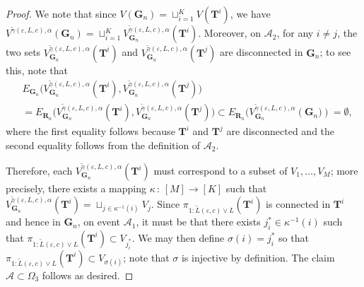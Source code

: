 \documentclass[twoside,11pt]{article}
\theoremstyle{remark}
\begin{document}
\begin{proof}
We note that since $V(\bm{G}_n) = \sqcup_{i=1}^K V(\bm{T}^i)$, we have $V^{{{\tilde{\gamma}(\varepsilon, L,c)}},\alpha}(\bm{G}_n) = \sqcup_{i=1}^K V_{\bm{G}_n}^{{{\tilde{\gamma}(\varepsilon, L,c)}}, \alpha}(\bm{T}^i)$. 
Moreover, on $\mathcal{A}_2$, for any $i \neq j$, the two sets $V^{{{\tilde{\gamma}(\varepsilon, L,c)}}, \alpha}_{\boldsymbol{G}_n}(\boldsymbol{T}^i)$ and $V^{{{\tilde{\gamma}(\varepsilon, L,c)}}, \alpha}_{\boldsymbol{G}_n}(\boldsymbol{T}^j)$ are disconnected in $\bm{G}_n$; to see this, note that
\begingroup
\[
\begin{aligned}
&E_{\boldsymbol{G}_n}\bigl(V^{{{\tilde{\gamma}(\varepsilon, L,c)}}, \alpha}_{\boldsymbol{G}_n}(\boldsymbol{T}^i),V^{{{\tilde{\gamma}(\varepsilon, L,c)}}, \alpha}_{\boldsymbol{G}_n}(\boldsymbol{T}^j)\bigr)\\
&=E_{\boldsymbol{R}_n}\bigl(V^{{{\tilde{\gamma}(\varepsilon, L,c)}}, \alpha}_{\boldsymbol{G}_n}(\boldsymbol{T}^i),V^{{{\tilde{\gamma}(\varepsilon, L,c)}}, \alpha}_{\boldsymbol{G}_n}(\boldsymbol{T}^j)\bigr)\subset E_{\boldsymbol{R}_n}\bigl(V^{{{\tilde{\gamma}(\varepsilon, L,c)}}, \alpha}_{\boldsymbol{G}_n}\left(\boldsymbol{G}_{n}\bigr)\right)=\emptyset,
\end{aligned}
\]
\endgroup
where the first equality follows because $\bm{T}^i$ and $\bm{T}^j$ are disconnected and the second equality follows from the definition of $\mathcal{A}_2$. 

Therefore, each $V^{{{\tilde{\gamma}(\varepsilon, L,c)}}, \alpha}_{\bm{G}_n}(\bm{T}^i)$ must correspond to a subset of $V_1, \ldots, V_M$; more precisely, there exists a mapping $\kappa \,:\, [M] \rightarrow [K]$ such that $V^{{{\tilde{\gamma}(\varepsilon, L,c)}}, \alpha}_{\bm{G}_n}(\bm{T}^i) = \sqcup_{j \in \kappa^{-1}(i)} V_j$. Since $\pi_{1:\tilde{L}(\varepsilon, c) \vee L }(\bm{T}^i)$ is connected in $\bm{T}^i$ and hence in $\bm{G}_n$, on event $\mathcal{A}_1$, it must be that there exists $j^*_i \in \kappa^{-1}(i)$ such that $\pi_{1:{\tilde{L}(\varepsilon, c)} \vee L }(\bm{T}^i) \subset V_{j^*_i}$. We may then define $\sigma(i) = j^*_i$ so that $\pi_{1:{\tilde{L}(\varepsilon, c)} \vee L }(\bm{T}^i) \subset V_{\sigma(i)}$; note that $\sigma$ is injective by definition. 
The claim $\mathcal{A}\subset \Omega_3$ follows as desired.


\end{proof}
\end{document}
